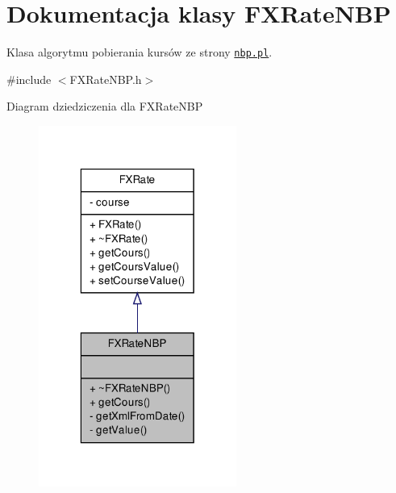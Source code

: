 \hypertarget{class_f_x_rate_n_b_p}{\section{\-Dokumentacja klasy \-F\-X\-Rate\-N\-B\-P}
\label{class_f_x_rate_n_b_p}
}


\-Klasa algorytmu pobierania kursów ze strony \href{http://www.nbp.pl}{\tt nbp.\-pl}.  




{\ttfamily \#include $<$\-F\-X\-Rate\-N\-B\-P.\-h$>$}



\-Diagram dziedziczenia dla \-F\-X\-Rate\-N\-B\-P\nopagebreak
\begin{figure}[H]
\begin{center}
\leavevmode
\includegraphics[width=184pt]{class_f_x_rate_n_b_p__inherit__graph}
\end{center}
\end{figure}


